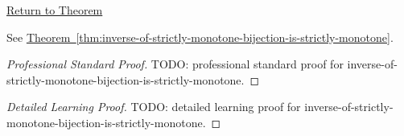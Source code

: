 \newpage
{}
\label{prf:inverse-of-strictly-monotone-bijection-is-strictly-monotone}

\begin{remark*}[Return]
\hyperref[thm:inverse-of-strictly-monotone-bijection-is-strictly-monotone]{Return to Theorem}
\end{remark*}

\begin{theorem*}
See \hyperref[thm:inverse-of-strictly-monotone-bijection-is-strictly-monotone]{Theorem~\ref*{thm:inverse-of-strictly-monotone-bijection-is-strictly-monotone}}.
\end{theorem*}

\begin{proof}[Professional Standard Proof]
\LRAProofBodyStart
TODO: professional standard proof for inverse-of-strictly-monotone-bijection-is-strictly-monotone.
\end{proof}

\begin{proof}[Detailed Learning Proof]
\LRAProofBodyStart
TODO: detailed learning proof for inverse-of-strictly-monotone-bijection-is-strictly-monotone.
\end{proof}

\begin{remark*}
\end{remark*}

\begin{dependencies}
\NoLocalDependencies
\end{dependencies}

\clearpage
